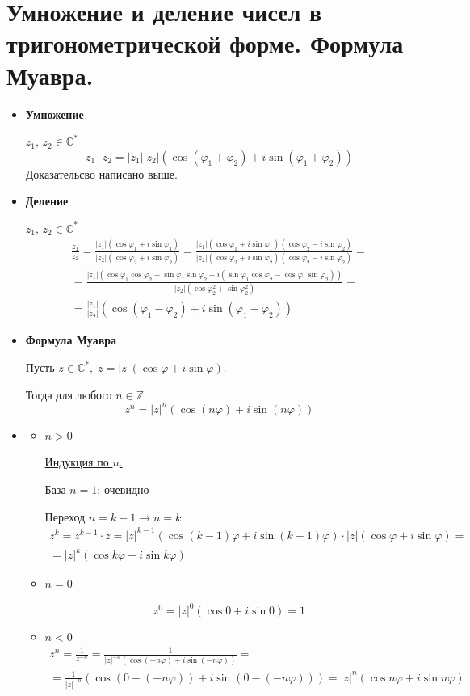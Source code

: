 \documentclass[12pt,letterpaper]{report}
\makeatletter
\theoremstyle{definition}
\renewenvironment{proof}[1][\proofname]{%
   \par\pushQED{\qed}\normalfont%
   \topsep6\p@\@plus6\p@\relax
   \trivlist\item[\hskip\labelsep\bfseries#1\@addpunct{.}]%
   \ignorespaces
}{%
   \popQED\endtrivlist\@endpefalse
}
\makeatother
\begin{document}
\section{Умножение и деление чисел в тригонометрической форме. Формула Муавра.}
\begin{itemize}
  \item \textbf{Умножение} 
  
  $z_1,\, z_2 \in \mathbb{C}^*$
  \[ z_1 \cdot z_2 = |z_1||z_2|(\cos(\varphi_1 + \varphi_2) + i\sin(\varphi_1 + \varphi_2)) \]
  Доказательсво написано выше.
  \item \textbf{Деление} 

  $z_1,\, z_2 \in \mathbb{C}^*$
  \begin{gather*}
    \frac{z_1}{z_2} = \frac{|z_1|(\cos\varphi_1 + i\sin\varphi_1)}{|z_2|(\cos\varphi_2 + i\sin\varphi_2)} = \frac{|z_1|(\cos\varphi_1 + i\sin\varphi_1)(\cos\varphi_2 - i\sin\varphi_2)}{|z_2|(\cos\varphi_2 + i\sin\varphi_2)(\cos\varphi_2 - i\sin\varphi_2)} = \\
    = \frac{|z_1|(\cos\varphi_1\cos\varphi_2 + \sin\varphi_1\sin\varphi_2 + i(\sin\varphi_1\cos\varphi_2 - \cos\varphi_1\sin\varphi_2))}{|z_2|(\cos\varphi_2^2 + \sin\varphi_2^2)} = \\
    = \frac{|z_1|}{|z_2|}(\cos(\varphi_1 - \varphi_2) + i\sin(\varphi_1 - \varphi_2))
  \end{gather*}
  \item \textbf{Формула Муавра}
  
  Пусть $z \in \mathbb{C}^*,\; z = |z|(\cos\varphi + i\sin\varphi)$. 

  Тогда для любого $n \in \mathbb{Z}$
  \[ z^n = |z|^n(\cos(n\varphi) + i\sin(n\varphi)) \]
  \begin{proof} \quad
    \begin{itemize}
      \item $n > 0$
      
      \underline{Индукция по $n$.}

      База $n = 1$: очевидно

      Переход $n = k - 1 \to n = k$
      \begin{gather*}
        z^k = z^{k-1} \cdot z = |z|^{k-1}(\cos(k - 1)\varphi + i\sin(k - 1)\varphi) \cdot |z|(\cos\varphi + i\sin\varphi) =  \\
        = |z|^k(\cos k\varphi + i\sin k\varphi)    
      \end{gather*}
      \item $n = 0$
      
      \[ z^0 = |z|^0(\cos 0 + i\sin 0) = 1 \]
      \item $n < 0$
      \begin{gather*}
        z^n = \frac{1}{z^{-n}} = \frac{1}{|z|^{-n}(\cos(-n\varphi) + i\sin(-n\varphi))} = \\
        = \frac{1}{|z|^{-n}}(\cos(0 - (-n\varphi)) + i\sin(0 - (-n\varphi))) = |z|^n(\cos n\varphi + i\sin n\varphi)
      \end{gather*}
    \end{itemize}
  \end{proof}
  
\end{itemize}
\end{document}
